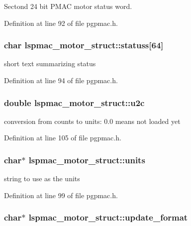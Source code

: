 Sectond 24 bit PMAC motor status word. 

Definition at line 92 of file pgpmac.h.\hypertarget{structlspmac__motor__struct_ae4a6f54a98e7758d66228efebe8f3baa}{
\subsubsection[{statuss}]{\setlength{\rightskip}{0pt plus 5cm}char {\bf lspmac\_\-motor\_\-struct::statuss}\mbox{[}64\mbox{]}}}
\label{structlspmac__motor__struct_ae4a6f54a98e7758d66228efebe8f3baa}


short text summarizing status 

Definition at line 94 of file pgpmac.h.\hypertarget{structlspmac__motor__struct_a61415627ab2dc0f438b190d117e532db}{
\subsubsection[{u2c}]{\setlength{\rightskip}{0pt plus 5cm}double {\bf lspmac\_\-motor\_\-struct::u2c}}}
\label{structlspmac__motor__struct_a61415627ab2dc0f438b190d117e532db}


conversion from counts to units: 0.0 means not loaded yet 

Definition at line 105 of file pgpmac.h.\hypertarget{structlspmac__motor__struct_a82bceff2ae698b4b9618360b446aec08}{
\subsubsection[{units}]{\setlength{\rightskip}{0pt plus 5cm}char$\ast$ {\bf lspmac\_\-motor\_\-struct::units}}}
\label{structlspmac__motor__struct_a82bceff2ae698b4b9618360b446aec08}


string to use as the units 

Definition at line 99 of file pgpmac.h.\hypertarget{structlspmac__motor__struct_a514ee9ed48c7171157d579623f7de23f}{
\subsubsection[{update\_\-format}]{\setlength{\rightskip}{0pt plus 5cm}char$\ast$ {\bf lspmac\_\-motor\_\-struct::update\_\-format}}}
\label{structlspmac__motor__struct_a514ee9ed48c7171157d579623f7de23f}


